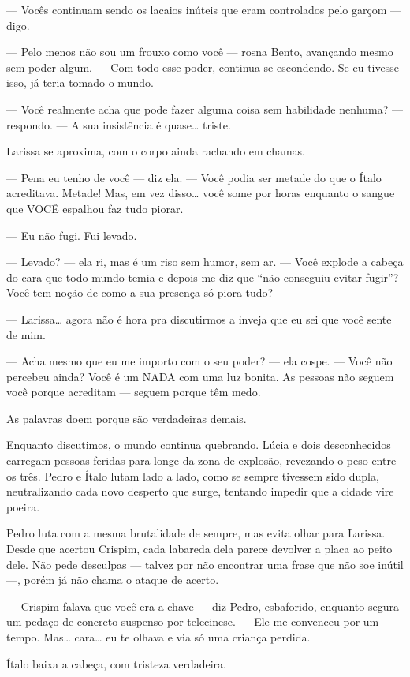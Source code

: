 — Vocês continuam sendo os lacaios inúteis que eram controlados pelo garçom — digo.

— Pelo menos não sou um frouxo como você — rosna Bento, avançando mesmo sem poder algum. — Com todo esse poder, continua se escondendo. Se eu tivesse isso, já teria tomado o mundo.

— Você realmente acha que pode fazer alguma coisa sem habilidade nenhuma? — respondo. — A sua insistência é quase… triste.

Larissa se aproxima, com o corpo ainda rachando em chamas.

— Pena eu tenho de você — diz ela. — Você podia ser metade do que o Ítalo acreditava. Metade! Mas, em vez disso… você some por horas enquanto o sangue que VOCÊ espalhou faz tudo piorar.

— Eu não fugi. Fui levado.

— Levado? — ela ri, mas é um riso sem humor, sem ar. — Você explode a cabeça do cara que todo mundo temia e depois me diz que “não conseguiu evitar fugir”? Você tem noção de como a sua presença só piora tudo?

— Larissa… agora não é hora pra discutirmos a inveja que eu sei que você sente de mim.

— Acha mesmo que eu me importo com o seu poder? — ela cospe. — Você não percebeu ainda? Você é um NADA com uma luz bonita. As pessoas não seguem você porque acreditam — seguem porque têm medo.

As palavras doem porque são verdadeiras demais.

\bigskip

Enquanto discutimos, o mundo continua quebrando. Lúcia e dois desconhecidos carregam pessoas feridas para longe da zona de explosão, revezando o peso entre os três. Pedro e Ítalo lutam lado a lado, como se sempre tivessem sido dupla, neutralizando cada novo desperto que surge, tentando impedir que a cidade vire poeira.

Pedro luta com a mesma brutalidade de sempre, mas evita olhar para Larissa. Desde que acertou Crispim, cada labareda dela parece devolver a placa ao peito dele. Não pede desculpas — talvez por não encontrar uma frase que não soe inútil —, porém já não chama o ataque de acerto.

— Crispim falava que você era a chave — diz Pedro, esbaforido, enquanto segura um pedaço de concreto suspenso por telecinese. — Ele me convenceu por um tempo. Mas… cara… eu te olhava e via só uma criança perdida.

Ítalo baixa a cabeça, com tristeza verdadeira.

